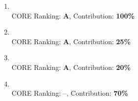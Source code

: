 \begin{enumerate}
  \item {} \\
  \textbullet\enspace CORE Ranking: \textbf{A}, Contribution: \textbf{100\%}
  
  \item {} \\
  \textbullet\enspace CORE Ranking: \textbf{A}, Contribution: \textbf{25\%} %
  
  \item {} \\
  \textbullet\enspace CORE Ranking: \textbf{A}, Contribution: \textbf{20\%}
  
  \item {} \\
  \textbullet\enspace CORE Ranking: --, Contribution: \textbf{70\%}
\end{enumerate}


